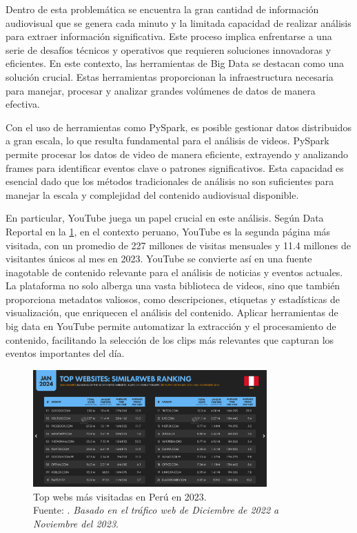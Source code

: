 Dentro de esta problemática se encuentra la gran cantidad de información audiovisual que se genera cada minuto y la limitada capacidad de realizar análisis para extraer información significativa. 
Este proceso implica enfrentarse a una serie de desafíos técnicos y operativos que requieren soluciones innovadoras y eficientes. En este contexto, las herramientas de Big Data se destacan como una solución crucial. Estas herramientas proporcionan la infraestructura necesaria para manejar, procesar y analizar grandes volúmenes de datos de manera efectiva.

Con el uso de herramientas como PySpark, es posible gestionar datos distribuidos a gran escala, lo que resulta fundamental para el análisis de videos. PySpark permite procesar los datos de video de manera eficiente, extrayendo y analizando frames para identificar eventos clave o patrones significativos. Esta capacidad es esencial dado que los métodos tradicionales de análisis no son suficientes para manejar la escala y complejidad del contenido audiovisual disponible.

En particular, YouTube juega un papel crucial en este análisis. Según Data Reportal en la \ref{2:fig}, en el contexto peruano, YouTube es la segunda página más visitada, con un promedio de 227 millones de visitas mensuales y 11.4 millones de visitantes únicos al mes en 2023. 
YouTube se convierte así en una fuente inagotable de contenido relevante para el análisis de noticias y eventos actuales. La plataforma no solo alberga una vasta biblioteca de videos, sino que también proporciona metadatos valiosos, como descripciones, etiquetas y estadísticas de visualización, que enriquecen el análisis del contenido. 
Aplicar herramientas de big data en YouTube permite automatizar la extracción y el procesamiento de contenido, facilitando la selección de los clips más relevantes que capturan los eventos importantes del día.

\begin{figure}[h]
    \centering
	\includegraphics[width=0.80\textwidth]{1/figures/Top_Peru_2023.png}
	\caption[Top webs más visitadas en Perú en 2023]{Top webs más visitadas en Perú en 2023. \\ Fuente: \cite{youtube_peru}. \textit{Basado en el tráfico web de Diciembre de 2022 a Noviembre del 2023}.}
	\label{2:fig}
\end{figure}

